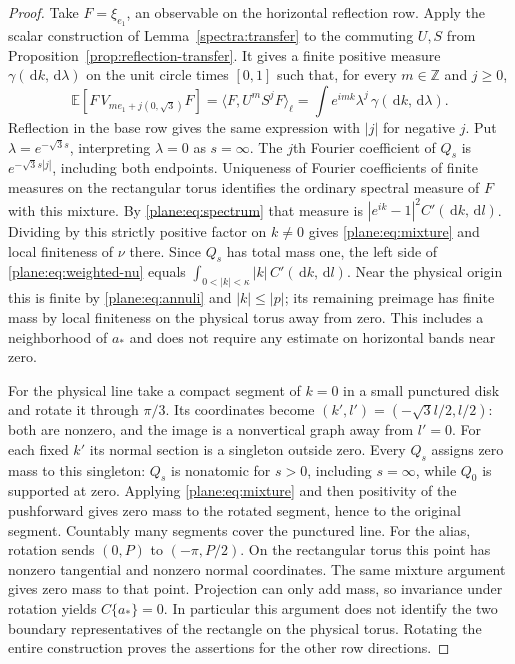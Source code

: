 \documentclass[11pt]{article}
\theoremstyle{definition}
\theoremstyle{remark}
\numberwithin{equation}{section}
\begin{document}
\begin{proof}
Take $F=\xi_{e_1}$, an observable on the horizontal reflection row.
Apply the scalar construction of Lemma~\ref{spectra:transfer} to the
commuting $U,S$ from Proposition~\ref{prop:reflection-transfer}.
It gives a finite positive measure $\gamma(\,\mathrm d k,\,\mathrm d\lambda)$ on the
unit circle times $[0,1]$ such that, for every $m\in\mathbb Z$ and $j\ge0$,
\[
 \mathbb E[F\,V_{me_1+j(0,\sqrt3)}F]
   =\langle F,U^mS^jF\rangle_\ell
   =\int e^{imk}\lambda^j\,\gamma(\,\mathrm d k,\,\mathrm d\lambda).
\]
Reflection in the base row gives the same expression with $|j|$ for
negative $j$.  Put $\lambda=e^{-\sqrt3s}$, interpreting $\lambda=0$ as
$s=\infty$.  The $j$th Fourier coefficient of $Q_s$ is
$e^{-\sqrt3s|j|}$, including both endpoints.  Uniqueness of Fourier
coefficients of finite measures on the rectangular torus identifies
the ordinary spectral measure of $F$ with this mixture.
By \eqref{plane:eq:spectrum} that measure is
$|e^{ik}-1|^2 C'(\,\mathrm d k,\,\mathrm d l)$.  Dividing by this strictly positive
factor on $k\ne0$ gives \eqref{plane:eq:mixture} and local finiteness
of $\nu$ there.
Since $Q_s$ has total mass one, the left side of
\eqref{plane:eq:weighted-nu} equals
$\int_{0<|k|<\kappa}|k|\,C'(\,\mathrm d k,\,\mathrm d l)$.
Near the physical origin this is finite by \eqref{plane:eq:annuli} and
$|k|\le|p|$; its remaining preimage has finite mass by local finiteness
on the physical torus away from zero.  This includes a neighborhood of
$a_*$ and does not require any estimate on horizontal bands near zero.

For the physical line take a compact segment of $k=0$ in a small
punctured disk and rotate it through $\pi/3$.  Its coordinates become
$(k',l')=(-\sqrt3l/2,l/2)$: both are nonzero, and the image is a
nonvertical graph away from $l'=0$.  For each fixed $k'$ its normal
section is a singleton outside zero.  Every $Q_s$ assigns zero mass
to this singleton: $Q_s$ is nonatomic for $s>0$, including $s=\infty$,
while $Q_0$ is supported at zero.  Applying \eqref{plane:eq:mixture}
and then positivity of the pushforward gives zero mass to the rotated
segment, hence to the original segment.  Countably many segments cover
the punctured line.
For the alias, rotation sends $(0,P)$ to $(-\pi,P/2)$.
On the rectangular torus this point has nonzero tangential and nonzero
normal coordinates.  The same mixture argument gives zero mass to that
point.  Projection can only add mass, so invariance under rotation yields
$C\{a_*\}=0$.  In particular this argument does not identify the two
boundary representatives of the rectangle on the physical torus.
Rotating the entire construction proves the assertions for the other
row directions.
\end{proof}
\end{document}
